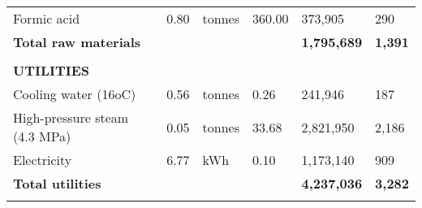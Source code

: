 \begin{table}[H]
\begin{tabular}{llllll}
Formic acid                                   & 0.80                                   & tonnes                                                             & 360.00                      & 373,905               & 290                                      \\ \cline{5-6} 
\textbf{Total raw materials}                  & \textbf{}                              & \textbf{}                                                          & \textbf{}                   & \textbf{1,795,689}    & \textbf{1,391}                           \\
                                              &                                        &                                                                    &                             & \textbf{}             &                                          \\
\textbf{UTILITIES}                            &                                        &                                                                    &                             & \textbf{}             &                                          \\
Cooling water (16oC)                          & 0.56                                   & tonnes                                                             & 0.26                        & 241,946               & 187                                      \\
High-pressure steam (4.3 MPa)                 & 0.05                                   & tonnes                                                             & 33.68                       & 2,821,950             & 2,186                                    \\
Electricity                                   & 6.77                                   & kWh                                                                & 0.10                        & 1,173,140             & 909                                      \\ \cline{5-6} 
\textbf{Total utilities}                      & \textbf{}                              & \textbf{}                                                          & \textbf{}                   & \textbf{4,237,036}    & \textbf{3,282}                           \\
                                              &                                        &                                                                    &                             & \textbf{}             &                                          \\

\end{tabular}
\end{table}
